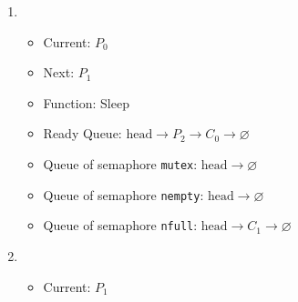 \documentclass[11pt]{article}
\begin{document}
\begin{question}
\begin{enumerate}
{}
                \item {
                    \begin{itemize}
                        \item{Current: $P_{0}$}
                        \item{Next: $P_{1}$}
                        \item{Function: Sleep}
                        \item{
                            Ready Queue: $\text{head}\longrightarrow
                            P_{2}\longrightarrow
                            C_{0}\longrightarrow
                            \varnothing$
                        } \item{
                            Queue of semaphore {\tt mutex}: $\text{head}\longrightarrow
                            \varnothing$
                        }
                        \item{
                            Queue of semaphore {\tt nempty}: $\text{head}\longrightarrow
                            \varnothing$
                        }
                        \item{
                            Queue of semaphore {\tt nfull}: $\text{head}\longrightarrow
                            C_{1}\longrightarrow
                            \varnothing$
                        }
                \end{itemize}}
                \item {
                    \begin{itemize}
                        \item{Current: $P_{1}$}

\end{itemize}}
\end{enumerate}
\end{question}
\end{document}
